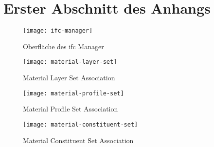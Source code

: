 \section{Erster Abschnitt des Anhangs}
\label{a:append}

\begin{figure}[h]
	\centering
	\texttt{[image: ifc-manager]}
	\caption[IFC Manager]{Oberfläche des \ac{ifc} Manager}
	\label{fig:ifc-manager}
\end{figure}

\begin{figure}[h]
	\centering
	\texttt{[image: material-layer-set]}
	\caption[IfcMaterialLayerSet]{Material Layer Set Association}
	\label{fig:layer-set}
\end{figure}

\begin{figure}[h]
	\centering
	\texttt{[image: material-profile-set]}
	\caption[IfcMaterialProfileSet]{Material Profile Set Association}
	\label{fig:profile-set}
\end{figure}

\begin{figure}[h]
	\centering
	\texttt{[image: material-constituent-set]}
	\caption[IfcMaterialConsituentSet]{Material Constituent Set Association}
	\label{fig:constituent-set}
\end{figure}
